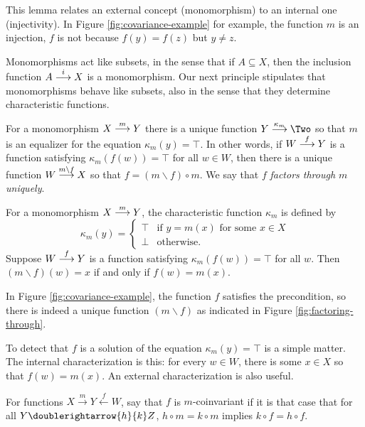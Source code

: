 This lemma relates an external concept (monomorphism) to an internal one (injectivity). 
In Figure \ref{fig:covariance-example} for example, the function $m$ is an injection, $f$ is not because $f(y)=f(z)$ but $y\neq z$.

Monomorphisms act like subsets, in the sense that if $A\subseteq X$, then the inclusion function $\sfromto iAX$ is a monomorphism. Our next principle stipulates that monomorphisms behave like subsets, also in the sense that they determine characteristic functions.

\begin{principle}
	For a monomorphism $\sfromto mXY$ there is a unique function $\sfromto {\kappa_m}Y\Two$ so that $m$ is an equalizer for the equation $\kappa_m(y) = \top$. 
	In other words, if $\sfromto fWY$ is a function satisfying $\kappa_m(f(w))=\top$ for all $w\in W$, then there is a unique function $\sfromto {m\backslash f}WX$ so that $f = (m\backslash f)\circ m$.  
	We say that $f$ \emph{factors through $m$ uniquely}.
	
	For a monomorphism $\sfromto mXY$, the characteristic function $\kappa_m$ is defined by
	\[\kappa_m(y) = \begin{cases}
	    \top & \text{if $y = m(x)$ for some $x\in X$}\\
	    \bot & \text{otherwise}.
	\end{cases}\]
	Suppose $\sfromto fWY$ is a function satisfying $\kappa_m(f(w)) = \top$ for all $w$. Then $(m\backslash f)(w) = x$ if and only if $f(w)=m(x)$. 
\end{principle}

In Figure \ref{fig:covariance-example}, the function $f$ satisfies the precondition, so there is indeed a unique function $(m\backslash f)$ as indicated in Figure \ref{fig:factoring-through}.

To detect that $f$ is a solution of the equation $\kappa_m(y)=\top$ is a simple matter. The internal characterization is this: for every $w\in W$, there is some $x\in X$ so that $f(w)=m(x)$. An external characterization is also useful.
\begin{defn}
	For functions $X\stackrel{m}{\longrightarrow}Y\stackrel{f}{\longleftarrow}W$, say that $f$ is {$m$-coinvariant} if it is that case that for all $Y\doublerightarrow{h}{k}Z$, $h\circ m=k\circ m$ implies $k\circ f = h\circ f$.
\end{defn}

